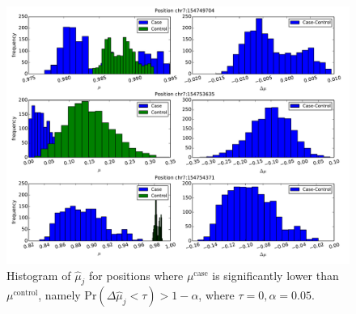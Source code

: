 \documentclass[11pt,reqno]{amsart}
\begin{document}
\begin{figure}[H]
\begin{center}
\includegraphics[width=120mm]{pdf_figs/HCC1187_histogram_neg.pdf}
\caption{Histogram of $ \hat{\mu}_j $ for positions where $\mu^{\text{case}}$ is significantly lower than $ \mu^{\text{control}}$, namely Pr$ (\Delta \hat{\mu}_j< \tau) > 1- \alpha $, where $ \tau=0, \alpha=0.05 $.}
\label{fig:hist_neg}
\end{center}
\end{figure}

\bigskip
\bigskip






\end{document}
